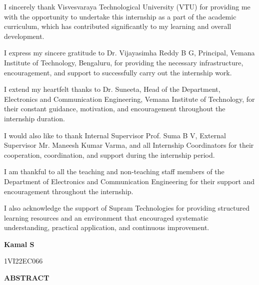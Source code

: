 \documentclass[12pt,a4paper]{report}
\begin{document}
\vspace{0.5cm}
\setlength{\parindent}{1.5em}
\begin{onehalfspacing}
I sincerely thank Visvesvaraya Technological University (VTU) for providing me with the opportunity to undertake this internship as a part of the academic curriculum, which has contributed significantly to my learning and overall development.

I express my sincere gratitude to Dr. Vijayasimha Reddy B G, Principal, Vemana Institute of Technology, Bengaluru, for providing the necessary infrastructure, encouragement, and support to successfully carry out the internship work.

I extend my heartfelt thanks to Dr. Suneeta, Head of the Department, Electronics and Communication Engineering, Vemana Institute of Technology, for their constant guidance, motivation, and encouragement throughout the internship duration.

I would also like to thank Internal Supervisor Prof. Suma B V, External Supervisor Mr. Maneesh Kumar Varma, and all Internship Coordinators for their cooperation, coordination, and support during the internship period.

I am thankful to all the teaching and non-teaching staff members of the Department of Electronics and Communication Engineering for their support and encouragement throughout the internship.

I also acknowledge the support of Supram Technologies for providing structured learning resources and an environment that encouraged systematic understanding, practical application, and continuous improvement.
\end{onehalfspacing}

\vspace{1cm}
\begin{flushright}
\textbf{Kamal S}\par
1VI22EC066\par
\end{flushright}

\newpage
\begin{center}
{\Large \textbf{ABSTRACT}\par}
\end{center}

\vspace{0.5cm}
\setlength{\parindent}{1.5em}
\end{document}
